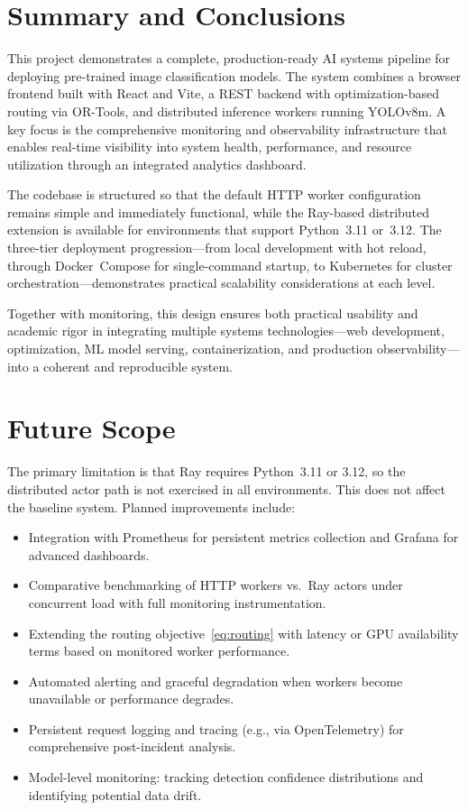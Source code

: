 \documentclass[12pt,a4paper]{report}
\begin{document}
\chapter{Summary and Conclusions}
This project demonstrates a complete, production-ready AI systems pipeline for deploying pre-trained image classification models. The system combines a browser frontend built with React and Vite, a REST backend with optimization-based routing via OR-Tools, and distributed inference workers running YOLOv8m. A key focus is the comprehensive monitoring and observability infrastructure that enables real-time visibility into system health, performance, and resource utilization through an integrated analytics dashboard.

The codebase is structured so that the default HTTP worker configuration remains simple and immediately functional, while the Ray-based distributed extension is available for environments that support Python~3.11 or~3.12. The three-tier deployment progression---from local development with hot reload, through Docker~Compose for single-command startup, to Kubernetes for cluster orchestration---demonstrates practical scalability considerations at each level.

Together with monitoring, this design ensures both practical usability and academic rigor in integrating multiple systems technologies---web development, optimization, ML model serving, containerization, and production observability---into a coherent and reproducible system.

\chapter{Future Scope}
The primary limitation is that Ray requires Python~3.11 or 3.12, so the distributed actor path is not exercised in all environments. This does not affect the baseline system. Planned improvements include:
\begin{itemize}
  \item Integration with Prometheus for persistent metrics collection and Grafana for advanced dashboards.
  \item Comparative benchmarking of HTTP workers vs.\ Ray actors under concurrent load with full monitoring instrumentation.
  \item Extending the routing objective~\eqref{eq:routing} with latency or GPU availability terms based on monitored worker performance.
  \item Automated alerting and graceful degradation when workers become unavailable or performance degrades.
  \item Persistent request logging and tracing (e.g., via OpenTelemetry) for comprehensive post-incident analysis.
  \item Model-level monitoring: tracking detection confidence distributions and identifying potential data drift.
\end{itemize}
\end{document}
